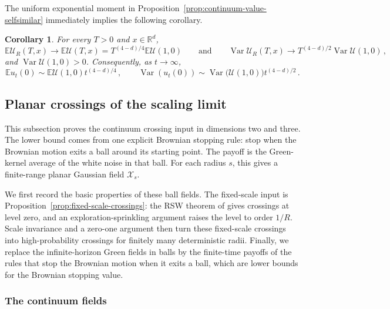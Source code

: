 \documentclass[11pt]{amsart}
\theoremstyle{plain}
\newtheorem{corollary}[theorem]{Corollary}
\theoremstyle{definition}
\newcommand{\R}{\mathbb{R}}
\newcommand{\E}{\mathbb{E}}
\DeclareMathOperator{\Var}{Var}
\begin{document}
		The
		uniform exponential moment in
		Proposition~\ref{prop:continuum-value-selfsimilar} immediately implies the following corollary. 

	\begin{corollary}\label{cor:dlt4-mean-asymptotic}
	For every $T>0$ and $x\in\R^d$,
		\[
			\E\mathcal U_R(T,x)
			\longrightarrow
			\E\mathcal U(T,x)=T^{(4-d)/4}\E\mathcal U(1,0)
			\qquad\text{and}\qquad
			\Var\mathcal U_R(T,x)
			\longrightarrow
			T^{(4-d)/2}\Var\mathcal U(1,0)\, ,
	\]
		and $\Var\mathcal U(1,0)>0$.
		Consequently, as $t\to\infty$,
		\[
			\E u_t(0)\sim \E\mathcal U(1,0)t^{(4-d)/4}\, ,
			\qquad
			\Var(u_t(0))\sim \Var\bigl(\mathcal U(1,0)\bigr) t^{(4-d)/2}\, .
		\]
	\end{corollary}

\subsection{Planar crossings of the scaling limit}\label{sec:continuum-version}

This subsection proves the continuum crossing input in dimensions two and
three. The lower bound comes from one explicit Brownian stopping rule: stop
when the Brownian motion exits a ball around its starting point. The payoff is
the Green-kernel average of the white noise in that ball. For each radius
$s$, this gives a finite-range planar Gaussian field $\mathcal X_s$.

We first record the basic properties of these ball fields. The fixed-scale
input is Proposition~\ref{prop:fixed-scale-crossings}: the RSW theorem of
\citet[Theorem~1]{KohlerSchindlerTassion} gives crossings at level zero, and
an exploration-sprinkling argument raises the level to order $1/R$. Scale
invariance and a zero-one argument then turn these fixed-scale crossings into
high-probability crossings for finitely many deterministic radii. Finally,
	we replace the infinite-horizon Green fields in balls by the finite-time
	payoffs of the rules that stop the Brownian motion when it exits a ball, which
	are lower bounds for the Brownian stopping value.

\subsubsection{The continuum fields}\label{ssec:admissible}
\end{document}
